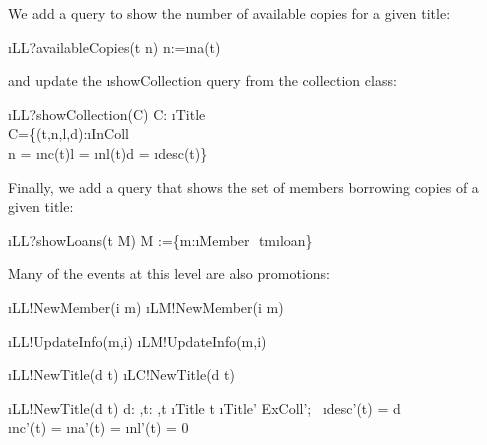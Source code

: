 \documentclass[12pt,a4paper]{article}
\begin{document}
\medskip\noindent
We add a query to show the number of available copies for a given title:
\begin{showspecs}
	\begin{spec}{\i{LL?availableCopies(t \to n)}}
		n:=\i{na}(t)
	\end{spec}
\end{showspecs}

\medskip\noindent
and update the \i{showCollection} query from the collection class:
\begin{showspecs}
	\begin{spec}{\i{LL?showCollection(\to C)}}
		C: \i{Title}\pfun{}\!\times{}\!\times{}\\
		C\!=\!\{(t,n,l,d):\i{InColl}\times{}\!\times{}\!\times{}\;\bullet\\
        \hspace{1cm} n = \i{nc}(t)\wedge l = \i{nl}(t)\wedge d = \i{desc}(t)\}
	\end{spec}
\end{showspecs}

\medskip\noindent
Finally, we add a query that shows the set of members borrowing copies of a given title:
\begin{showspecs}
	\begin{spec}{\i{LL?showLoans(t \to M)}}
		M :=\{m:\i{Member}\,\bullet\, t\mapsto m\in \i{loan}\}
	\end{spec}
\end{showspecs}

\medskip\noindent
Many of the events at this level are also promotions:
\begin{showspecs}
	\begin{spec}{\i{LL!NewMember(i \to m)}}
		\i{LM!NewMember(i \to m)}
	\end{spec}
\showbeside
	\begin{spec}{\i{LL!UpdateInfo(m,i)}}
		\i{LM!UpdateInfo(m,i)}
	\end{spec}
\end{showspecs}\smallskip
\begin{showspecs}
	\begin{spec}{\i{LL!NewTitle(d \to t)}}
		\i{LC!NewTitle(d \to t)}
	\end{spec}
\showbeside
	\begin{spec}[\equiv]{\i{LL!NewTitle(d \to t)}}
		d: \sep t: \sep t \notin \i{Title}
	\post	t \in \!\i{Title' \cap ExColl'};~ \i{desc'}(t) = d\\
		\i{nc'}(t) = \i{na'}(t) = \i{nl'}(t) = 0
	\end{spec}
\end{showspecs}
\end{document}
